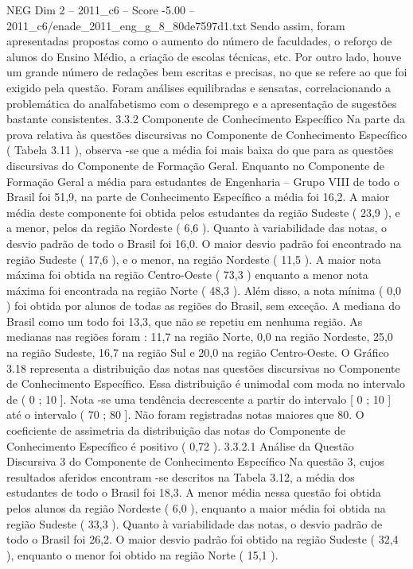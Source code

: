 \begin{textsample}{NEG Dim 2 – 2011\_c6 – Score -5.00 – 2011\_c6/enade\_2011\_eng\_g\_8\_80de7597d1.txt}
Sendo assim, foram apresentadas propostas como o aumento do número de faculdades, o reforço de alunos do Ensino Médio, a criação de escolas técnicas, etc.
Por outro lado, houve um grande número de redações bem escritas e precisas, no que se refere ao que foi exigido pela questão.
Foram análises equilibradas e sensatas, correlacionando a problemática do analfabetismo com o desemprego e a apresentação de sugestões bastante consistentes. 3.3.2 Componente de Conhecimento Específico Na parte da prova relativa às questões discursivas no Componente de Conhecimento Específico ( Tabela 3.11 ), observa -se que a média foi mais baixa do que para as questões discursivas do Componente de Formação Geral.
Enquanto no Componente de Formação Geral a média para estudantes de Engenharia – Grupo VIII de todo o Brasil foi 51,9, na parte de Conhecimento Específico a média foi 16,2.
A maior média deste componente foi obtida pelos estudantes da região Sudeste ( 23,9 ), e a menor, pelos da região Nordeste ( 6,6 ).
Quanto à variabilidade das notas, o desvio padrão de todo o Brasil foi 16,0.
O maior desvio padrão foi encontrado na região Sudeste ( 17,6 ), e o menor, na região Nordeste ( 11,5 ).
A maior nota máxima foi obtida na região Centro-Oeste ( 73,3 ) enquanto a menor nota máxima foi encontrada na região Norte ( 48,3 ).
Além disso, a nota mínima ( 0,0 ) foi obtida por alunos de todas as regiões do Brasil, sem exceção.
A mediana do Brasil como um todo foi 13,3, que não se repetiu em nenhuma região.
As medianas nas regiões foram : 11,7 na região Norte, 0,0 na região Nordeste, 25,0 na região Sudeste, 16,7 na região Sul e 20,0 na região Centro-Oeste.
O Gráfico 3.18 representa a distribuição das notas nas questões discursivas no Componente de Conhecimento Específico.
Essa distribuição é unimodal com moda no intervalo de ( 0 ; 10 ].
Nota -se uma tendência decrescente a partir do intervalo [ 0 ; 10 ] até o intervalo ( 70 ; 80 ].
Não foram registradas notas maiores que 80.
O coeficiente de assimetria da distribuição das notas do Componente de Conhecimento Específico é positivo ( 0,72 ). 3.3.2.1 Análise da Questão Discursiva 3 do Componente de Conhecimento Específico Na questão 3, cujos resultados aferidos encontram -se descritos na Tabela 3.12, a média dos estudantes de todo o Brasil foi 18,3.
A menor média nessa questão foi obtida pelos alunos da região Nordeste ( 6,0 ), enquanto a maior média foi obtida na região Sudeste ( 33,3 ).
Quanto à variabilidade das notas, o desvio padrão de todo o Brasil foi 26,2.
O maior desvio padrão foi obtido na região Sudeste ( 32,4 ), enquanto o menor foi obtido na região Norte ( 15,1 ).

\end{textsample}
